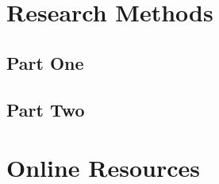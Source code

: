 \documentclass[acmtog]{acmart}
\begin{document}




\appendix

\section{Research Methods}

\subsection{Part One}

\subsection{Part Two}

\section{Online Resources}
\end{document}
